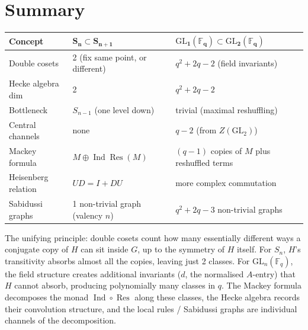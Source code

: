 \documentclass[12pt,a4paper]{article}
\theoremstyle{definition}
\theoremstyle{remark}
\newcommand{\F}{\mathbb{F}}
\newcommand{\Ind}{\operatorname{Ind}}
\newcommand{\Res}{\operatorname{Res}}
\newcommand{\GL}{\mathrm{GL}}
\begin{document}
\section{Summary}
\label{sec:summary}

\begin{center}
\renewcommand{\arraystretch}{1.6}
\begin{tabular}{@{}p{3.2cm}p{4.2cm}p{4.8cm}@{}}
\toprule
\textbf{Concept}
  & $\boldsymbol{S_n \subset S_{n+1}}$
  & $\boldsymbol{\GL_1(\F_q) \subset \GL_2(\F_q)}$ \\
\midrule
Double cosets
  & 2 (fix same point, or different)
  & $q^2 + 2q - 2$ (field invariants) \\
Hecke algebra dim
  & 2
  & $q^2 + 2q - 2$ \\
Bottleneck
  & $S_{n-1}$ (one level down)
  & trivial (maximal reshuffling) \\
Central channels
  & none
  & $q - 2$ (from $Z(\GL_2)$) \\
Mackey formula
  & $M \oplus \Ind \Res(M)$
  & $(q{-}1)$ copies of $M$ plus reshuffled terms \\
Heisenberg relation
  & $UD = I + DU$
  & more complex commutation \\
Sabidussi graphs
  & 1 non-trivial graph (valency $n$)
  & $q^2 + 2q - 3$ non-trivial graphs \\
\bottomrule
\end{tabular}
\end{center}

The unifying principle: double cosets count how many essentially
different ways a conjugate copy of $H$ can sit inside $G$, up to the
symmetry of $H$ itself. For $S_n$, $H$'s transitivity absorbs almost
all the copies, leaving just 2 classes. For $\GL_n(\F_q)$, the field
structure creates additional invariants ($d$, the normalised $A$-entry)
that $H$ cannot absorb, producing polynomially many classes in $q$.
The Mackey formula decomposes the monad $\Ind \circ \Res$ along these
classes, the Hecke algebra records their convolution structure, and the
local rules / Sabidussi graphs are individual channels of the
decomposition.
\end{document}
